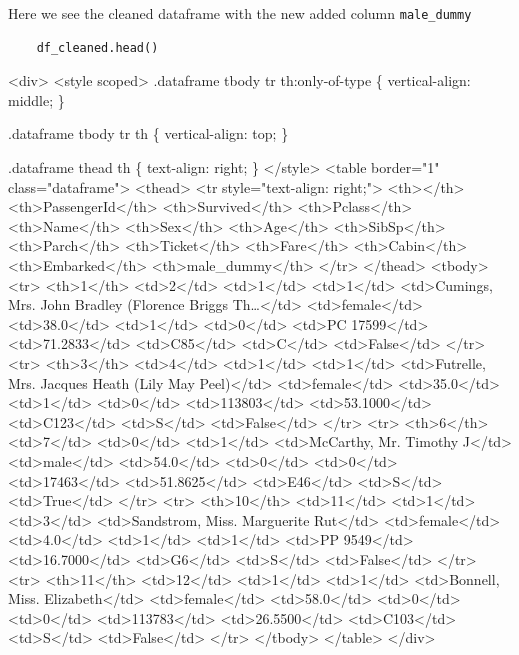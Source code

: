\documentclass[11pt]{article}
\begin{document}
Here we see the cleaned dataframe with the new added column \texttt{male\_dummy}

\begin{verbatim}
    df_cleaned.head()
\end{verbatim}

\begin{HTML}
<div>
<style scoped>
    .dataframe tbody tr th:only-of-type \{
	vertical-align: middle;
    \}

.dataframe tbody tr th \{
    vertical-align: top;
\}

    .dataframe thead th \{
	text-align: right;
    \}
</style>
<table border="1" class="dataframe">
  <thead>
    <tr style="text-align: right;">
      <th></th>
      <th>PassengerId</th>
      <th>Survived</th>
      <th>Pclass</th>
      <th>Name</th>
      <th>Sex</th>
      <th>Age</th>
      <th>SibSp</th>
      <th>Parch</th>
      <th>Ticket</th>
      <th>Fare</th>
      <th>Cabin</th>
      <th>Embarked</th>
      <th>male\_dummy</th>
    </tr>
  </thead>
  <tbody>
    <tr>
      <th>1</th>
      <td>2</td>
      <td>1</td>
      <td>1</td>
      <td>Cumings, Mrs. John Bradley (Florence Briggs Th\ldots{}</td>
      <td>female</td>
      <td>38.0</td>
      <td>1</td>
      <td>0</td>
      <td>PC 17599</td>
      <td>71.2833</td>
      <td>C85</td>
      <td>C</td>
      <td>False</td>
    </tr>
    <tr>
      <th>3</th>
      <td>4</td>
      <td>1</td>
      <td>1</td>
      <td>Futrelle, Mrs. Jacques Heath (Lily May Peel)</td>
      <td>female</td>
      <td>35.0</td>
      <td>1</td>
      <td>0</td>
      <td>113803</td>
      <td>53.1000</td>
      <td>C123</td>
      <td>S</td>
      <td>False</td>
    </tr>
    <tr>
      <th>6</th>
      <td>7</td>
      <td>0</td>
      <td>1</td>
      <td>McCarthy, Mr. Timothy J</td>
      <td>male</td>
      <td>54.0</td>
      <td>0</td>
      <td>0</td>
      <td>17463</td>
      <td>51.8625</td>
      <td>E46</td>
      <td>S</td>
      <td>True</td>
    </tr>
    <tr>
      <th>10</th>
      <td>11</td>
      <td>1</td>
      <td>3</td>
      <td>Sandstrom, Miss. Marguerite Rut</td>
      <td>female</td>
      <td>4.0</td>
      <td>1</td>
      <td>1</td>
      <td>PP 9549</td>
      <td>16.7000</td>
      <td>G6</td>
      <td>S</td>
      <td>False</td>
    </tr>
    <tr>
      <th>11</th>
      <td>12</td>
      <td>1</td>
      <td>1</td>
      <td>Bonnell, Miss. Elizabeth</td>
      <td>female</td>
      <td>58.0</td>
      <td>0</td>
      <td>0</td>
      <td>113783</td>
      <td>26.5500</td>
      <td>C103</td>
      <td>S</td>
      <td>False</td>
    </tr>
  </tbody>
</table>
</div>
\end{HTML}
\end{document}
